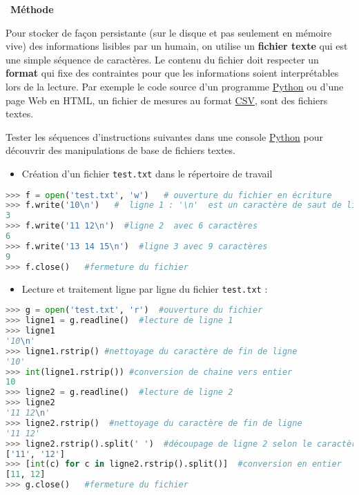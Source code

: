 \documentclass[
  10pt,
]{article}
\newcommand{\passthrough}[1]{#1}
\providecommand{\tightlist}{%
  \setlength{\itemsep}{0pt}\setlength{\parskip}{0pt}}
\newcounter{prog}
\newenvironment{methode}[1]
{\par \medskip    \noindent  
 \begin {bclogo}[arrondi =0.1,logo=\bcoutil, marge=4,noborder = true] {~\textbf{Méthode}   {\itshape #1} }  \par}
{
\end{bclogo}
 \par \bigskip }
\begin{document}
\begin{methode}{}

Pour stocker de façon persistante (sur le disque et pas seulement en
mémoire vive) des informations lisibles par un humain, on utilise un
\textbf{fichier texte} qui est une simple séquence de caractères. Le
contenu du fichier doit respecter un \textbf{format} qui fixe des
contraintes pour que les informations soient interprétables lors de la
lecture. Par exemple le code source d'un programme
\href{https://docs.python.org/3/tutorial/datastructures.html}{Python} ou
d'une page Web en HTML, un fichier de mesures au format
\href{https://fr.wikipedia.org/wiki/Comma-separated_values}{CSV}, sont
des fichiers textes.

Tester les séquences d'instructions suivantes dans une console
\href{https://docs.python.org/3/tutorial/datastructures.html}{Python}
pour découvrir des manipulations de base de fichiers textes.

\begin{itemize}
\tightlist
\item
  Création d'un fichier \passthrough{\lstinline!test.txt!} dans le
  répertoire de travail
\end{itemize}

\begin{lstlisting}[language=Python]
>>> f = open('test.txt', 'w')   # ouverture du fichier en écriture
>>> f.write('10\n')   #  ligne 1 : '\n'  est un caractère de saut de ligne
3
>>> f.write('11 12\n')  #ligne 2  avec 6 caractères 
6
>>> f.write('13 14 15\n')  #ligne 3 avec 9 caractères
9
>>> f.close()   #fermeture du fichier
\end{lstlisting}

\begin{itemize}
\tightlist
\item
  Lecture et traitement ligne par ligne du fichier
  \passthrough{\lstinline!test.txt!} :
\end{itemize}

\begin{lstlisting}[language=Python]
>>> g = open('test.txt', 'r')  #ouverture du fichier
>>> ligne1 = g.readline()  #lecture de ligne 1
>>> ligne1
'10\n'
>>> ligne1.rstrip() #nettoyage du caractère de fin de ligne
'10'
>>> int(ligne1.rstrip()) #conversion de chaine vers entier
10
>>> ligne2 = g.readline()  #lecture de ligne 2
>>> ligne2
'11 12\n'
>>> ligne2.rstrip()  #nettoyage du caractère de fin de ligne
'11 12'
>>> ligne2.rstrip().split(' ')  #découpage de ligne 2 selon le caractère par défaut de séparation ' ', on peut écrire juste split() 
['11', '12']
>>> [int(c) for c in ligne2.rstrip().split()]  #conversion en entier
[11, 12]
>>> g.close()   #fermeture du fichier
\end{lstlisting}

\end{methode}
\end{document}
